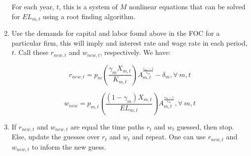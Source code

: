 \documentclass[letterpaper,12pt]{article}
\theoremstyle{definition}
\begin{document}
\begin{spacing}{1.5}
\begin{enumerate}
	For each year, $t$, this is a system of $M$ nonlinear equations that can be solved for $EL_{m,t}$ using a root finding algorithm.
	
\item Use the demands for capital and labor found above in the FOC for a particular firm, this will imply and interest rate and wage rate in each period, $t$.  Call these $r_{new,t}$ and $w_{new,t}$, respectively.  We have:

	\begin{equation}
	r_{new,t} = p_{m}\left(\frac{\gamma_{m}X_{m,t}}{K_{m,t}}\right)A_{m,t}^{\frac{\epsilon_{m}-1}{\epsilon_{m}}}-\delta_{m}, \forall \ m, t
	\end{equation}

	\begin{equation}
	w_{new} = p_{m,t}\left(\frac{(1-\gamma_{m})X_{m,t}}{EL_{m,t}}\right)A_{m,t}^{\frac{\epsilon_{m}-1}{\epsilon_{m}}}, \forall \ m, t
	\end{equation}

\item If $r_{new,t}$ and $w_{new,t}$ are equal the time paths $r_{t}$ and $w_{t}$ guessed, then stop.  Else, update the guesses over $r_{t}$ and $w_{t}$ and repeat.  One can use $r_{new,t}$ and $w_{new,t}$ to inform the new guess. 

\end{enumerate}

\end{spacing}
\end{document}
